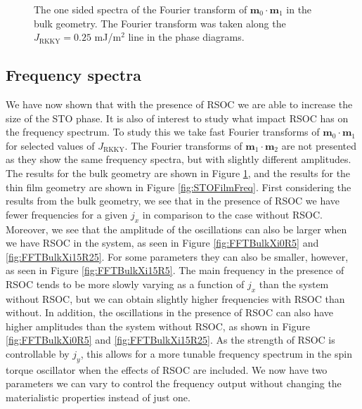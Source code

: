 \begin{figure}[h!]
\caption{The one sided spectra of the Fourier transform of $\mathbold{m}_0\cdot\mathbold{m}_1$ in the bulk geometry. The Fourier transform was taken along the $J_{\text{RKKY}}=0.25$ mJ/m$^2$ line in the phase diagrams.}
\label{fig:STOBulkFreq}
\end{figure}
\subsection{Frequency spectra}
We have now shown that with the presence of RSOC we are able to increase the size of the STO phase. It is also of interest to study what impact RSOC has on the frequency spectrum. To study this we take fast Fourier transforms of $\mathbold{m}_0\cdot\mathbold{m}_1$ for selected values of $J_{\text{RKKY}}$. The Fourier transforms of $\mathbold{m}_1\cdot\mathbold{m}_2$ are not presented as they show the same frequency spectra, but with slightly different amplitudes. The results for the bulk geometry are shown in Figure \ref{fig:STOBulkFreq}, and the results for the thin film geometry are shown in Figure \ref{fig:STOFilmFreq}. First considering the results from the bulk geometry, we see that in the presence of RSOC we have fewer frequencies for a given $j_x$ in comparison to the case without RSOC. Moreover, we see that the amplitude of the oscillations can also be larger when we have RSOC in the system, as seen in Figure \ref{fig:FFTBulkXi0R5} and \ref{fig:FFTBulkXi15R25}. For some parameters they can also be smaller, however, as seen in Figure \ref{fig:FFTBulkXi15R5}. The main frequency in the presence of RSOC tends to be more slowly varying as a function of $j_x$ than the system without RSOC, but we can obtain slightly higher frequencies with RSOC than without. In addition, the oscillations in the presence of RSOC can also have higher amplitudes than the system without RSOC, as shown in Figure \ref{fig:FFTBulkXi0R5} and \ref{fig:FFTBulkXi15R25}. As the strength of RSOC is controllable by $j_y$, this allows for a more tunable frequency spectrum in the spin torque oscillator when the effects of RSOC are included. We now have two parameters we can vary to control the frequency output without changing the materialistic properties instead of just one.

